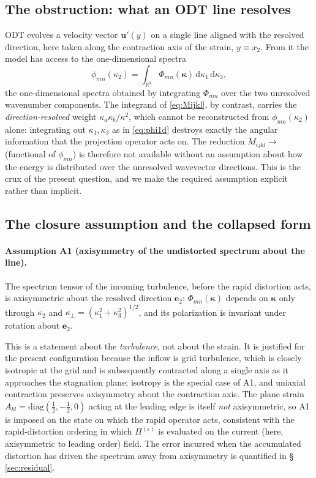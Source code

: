 \documentclass[lineno]{JFM-FLM_Au}
\newcounter{assumption}
\begin{document}
\subsection{The obstruction: what an ODT line resolves}\label{sec:obstruction}

ODT evolves a velocity vector $\boldsymbol{u}'(y)$ on a single line aligned
with the resolved direction, here taken along the contraction axis of the
strain, $y\equiv x_2$. From it the model has access to the one-dimensional
spectra
\begin{equation}
  \phi_{mn}(\kappa_2)
  = \int_{\mathbb{R}^2}
      \Phi_{mn}(\boldsymbol{\kappa})\,
      \mathrm{d}\kappa_1\,\mathrm{d}\kappa_3,
  \label{eq:phi1d}
\end{equation}
the one-dimensional spectra obtained by integrating $\Phi_{mn}$ over the two
unresolved wavenumber components. The integrand of \eqref{eq:Mijkl}, by
contrast, carries the \emph{direction-resolved} weight
$\kappa_a\kappa_b/\kappa^2$, which cannot be reconstructed from
$\phi_{mn}(\kappa_2)$ alone: integrating out $\kappa_1,\kappa_3$ as in
\eqref{eq:phi1d} destroys exactly the angular information that the projection
operator acts on. The reduction $M_{ijkl}\!\to\!$ (functional of
$\phi_{mn}$) is therefore not available without an assumption about how the
energy is distributed over the unresolved wavevector directions. This is the
crux of the present question, and we make the required assumption explicit
rather than implicit.

\subsection{The closure assumption and the collapsed form}
\label{sec:assumption}

\paragraph{Assumption A1 (axisymmetry of the undistorted spectrum about the
line).} The spectrum tensor of the incoming turbulence, before the rapid
distortion acts, is axisymmetric about the resolved direction $\boldsymbol{e}_2$:
$\Phi_{mn}(\boldsymbol{\kappa})$ depends on $\boldsymbol{\kappa}$ only through
$\kappa_2$ and $\kappa_\perp=(\kappa_1^2+\kappa_3^2)^{1/2}$, and its
polarization is invariant under rotation about $\boldsymbol{e}_2$.

This is a statement about the \emph{turbulence}, not about the strain. It is
justified for the present configuration because the inflow is grid turbulence,
which is closely isotropic at the grid and is subsequently contracted along a
single axis as it approaches the stagnation plane; isotropy is the special
case of A1, and uniaxial contraction preserves axisymmetry about the
contraction axis. The plane strain $A_{kl}=\mathrm{diag}(\tfrac12,-\tfrac12,0)$
acting at the leading edge is itself \emph{not} axisymmetric, so A1 is imposed
on the state on which the rapid operator acts, consistent with the
rapid-distortion ordering in which $\Pi^{(\mathrm r)}$ is evaluated on the
current (here, axisymmetric to leading order) field. The error incurred when
the accumulated distortion has driven the spectrum away from axisymmetry is
quantified in \S\,\ref{sec:residual}.
\end{document}
